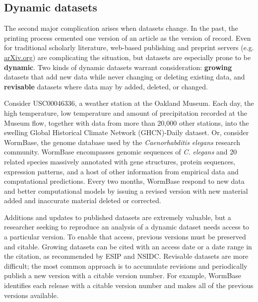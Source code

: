 \documentclass[10pt,a4paper,twocolumn]{article}
\begin{document}
{\subsection*{Dynamic datasets}\label{dynamic-data}

The second major complication arises when datasets change.
In the past, the printing process cemented one version of an article as the version of record.
Even for traditional scholarly literature, web-based publishing and preprint servers (e.g. \href{http://arxiv.org/}{arXiv.org}) are complicating the situation, but datasets are especially prone to be \textbf{dynamic}.
Two kinds of dynamic datasets warrant consideration: \textbf{growing} datasets that add new data while never changing or deleting existing data, and \textbf{revisable} datasets where data may by added, deleted, or changed.

Consider USC00046336, a weather station at the Oakland Museum.
Each day, the high temperature, low temperature and amount of precipitation recorded at the Museum \cite{global_historical_climate_data_network_daily_????} flow, together with data from more than 20,000 other stations, into the swelling Global Historical Climate Network (GHCN)-Daily\cite{menne_overview_2012} dataset.
Or, consider WormBase, the genome database used by the \textit{Caenorhabditis elegans} research community.
WormBase encompasses genomic sequences of \emph{C. elegans} and 20 related species massively annotated with gene structures, protein sequences, expression patterns, and a host of other information from empirical data and computational predictions.
Every two months, WormBase respond to new data and better computational models by issuing a revised version with new material added and inaccurate material deleted or corrected.

Additions and updates to published datasets are extremely valuable, but a researcher seeking to reproduce an analysis of a dynamic dataset needs access to a particular version.
To enable that access, previous versions must be preserved and citable.
Growing datasets can be cited with an access date or a date range in the citation, as recommended by ESIP and NSIDC.
Revisable datasets are more difficult; the most common approach is to accumulate revisions and periodically publish a new version with a citable version number.
For example, WormBase identifies each release with a citable version number and makes all of the previous versions available.

}
\end{document}
